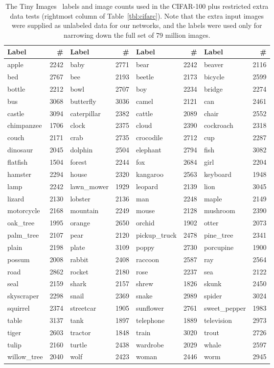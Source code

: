\documentclass{article}
\begin{document}
\begin{table}[t]
\centering
\caption{\label{tbl:cifarextra}The Tiny Images~\citep{Torralba2008} labels and image counts used in the CIFAR-100 plus restricted extra data tests (rightmost column of Table~\protect\ref{tbl:cifarc}). Note that the extra input images were supplied as unlabeled data for our networks, and the labels were used only for narrowing down the full set of 79 million images.\\
}
\small
\begin{tabular}{|LR|LR|LR|LR|}
\hline
Label & \# & Label & \# & Label & \# & Label & \# \\
\hline
apple & 2242 &baby & 2771 &bear & 2242 &beaver & 2116 \\
bed & 2767 &bee & 2193 &beetle & 2173 &bicycle & 2599 \\
bottle & 2212 &bowl & 2707 &boy & 2234 &bridge & 2274 \\
bus & 3068 &butterfly & 3036 &camel & 2121 &can & 2461 \\
castle & 3094 &caterpillar & 2382 &cattle & 2089 &chair & 2552 \\
chimpanzee & 1706 &clock & 2375 &cloud & 2390 &cockroach & 2318 \\
couch & 2171 &crab & 2735 &crocodile & 2712 &cup & 2287 \\
dinosaur & 2045 &dolphin & 2504 &elephant & 2794 &fish & 3082 \\
flatfish & 1504 &forest & 2244 &fox & 2684 &girl & 2204 \\
hamster & 2294 &house & 2320 &kangaroo & 2563 &keyboard & 1948 \\
lamp & 2242 &lawn\_mower & 1929 &leopard & 2139 &lion & 3045 \\
lizard & 2130 &lobster & 2136 &man & 2248 &maple & 2149 \\
motorcycle & 2168 &mountain & 2249 &mouse & 2128 &mushroom & 2390 \\
oak\_tree & 1995 &orange & 2650 &orchid & 1902 &otter & 2073 \\
palm\_tree & 2107 &pear & 2120 &pickup\_truck & 2478 &pine\_tree & 2341 \\
plain & 2198 &plate & 3109 &poppy & 2730 &porcupine & 1900 \\
possum & 2008 &rabbit & 2408 &raccoon & 2587 &ray & 2564 \\
road & 2862 &rocket & 2180 &rose & 2237 &sea & 2122 \\
seal & 2159 &shark & 2157 &shrew & 1826 &skunk & 2450 \\
skyscraper & 2298 &snail & 2369 &snake & 2989 &spider & 3024 \\
squirrel & 2374 &streetcar & 1905 &sunflower & 2761 &sweet\_pepper & 1983 \\
table & 3137 &tank & 1897 &telephone & 1889 &television & 2973 \\
tiger & 2603 &tractor & 1848 &train & 3020 &trout & 2726 \\
tulip & 2160 &turtle & 2438 &wardrobe & 2029 &whale & 2597 \\
willow\_tree & 2040 &wolf & 2423 &woman & 2446 &worm & 2945 \\
\hline
\end{tabular}
\end{table}
\end{document}
